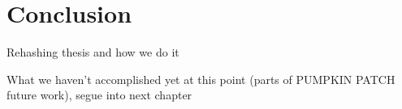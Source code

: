 \section{Conclusion}

Rehashing thesis and how we do it

What we haven't accomplished yet at this point (parts of PUMPKIN PATCH future work), segue into next chapter
